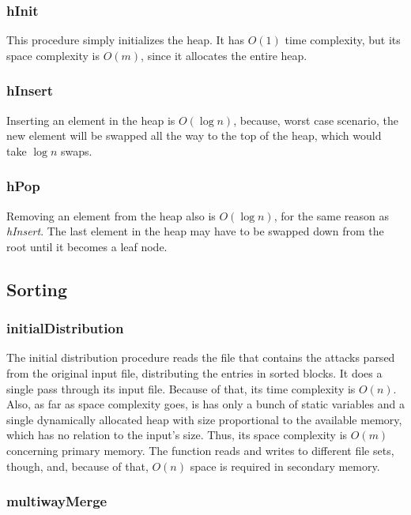 \documentclass[10pt,a4paper]{article}
\numberwithin{equation}{section}
\begin{document}
\subsubsection{hInit}

This procedure simply initializes the heap. It has $O(1)$ time complexity, but its space complexity is $O(m)$, since it allocates the entire heap.

\subsubsection{hInsert}

Inserting an element in the heap is $O(\log{n})$, because, worst case scenario, the new element will be swapped all the way to the top of the heap, which would take $\log{n}$ swaps.

\subsubsection{hPop}

Removing an element from the heap also is $O(\log{n})$, for the same reason as \emph{hInsert}. The last element in the heap may have to be swapped down from the root until it becomes a leaf node.

\subsection{Sorting}

\subsubsection{initialDistribution}

The initial distribution procedure reads the file that contains the attacks parsed from the original input file, distributing the entries in sorted blocks. It does a single pass through its input file. Because of that, its time complexity is $O(n)$. Also, as far as space complexity goes, is has only a bunch of static variables and a single dynamically allocated heap with size proportional to the available memory, which has no relation to the input's size. Thus, its space complexity is $O(m)$ concerning primary memory. The function reads and writes to different file sets, though, and, because of that, $O(n)$ space is required in secondary memory.

\subsubsection{multiwayMerge}
\end{document}
